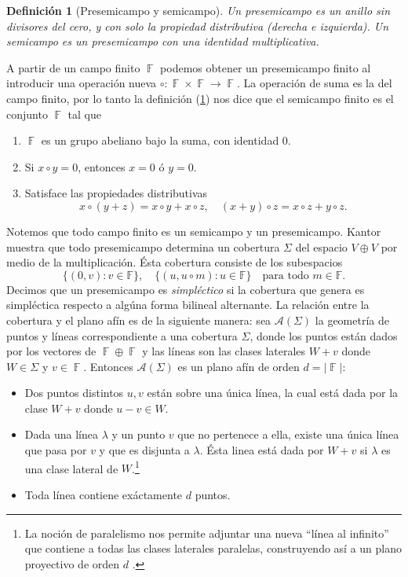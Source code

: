\documentclass[a4paper,11pt]{report}
\DeclareMathOperator{\F}{\mathbb{F}}
\newtheorem{definition}{Definición}
\begin{document}
  \begin{definition}[Presemicampo y semicampo]
    \label{def:presemifield}
    Un presemicampo es un anillo sin divisores del cero, y
    con solo la propiedad distributiva (derecha e
    izquierda). Un semicampo es un presemicampo con una
    identidad multiplicativa.
  \end{definition}
  A partir de un campo finito $\F$ podemos obtener un
  presemicampo finito al introducir una operación nueva
  $\circ : \F \times \F \to \F$. La operación de suma es la
  del campo finito, por lo tanto la definición
  (\ref{def:presemifield}) nos dice que el semicampo finito
  es el conjunto $\F$ tal que
  \begin{enumerate}
    \item $\F$ es un grupo abeliano bajo la suma, con
      identidad $0$.
    \item Si $x \circ y = 0$, entonces $x = 0$ ó $y = 0$.
    \item Satisface las propiedades distributivas
      \[
        x \circ (y + z) = x \circ y + x \circ z,
        \quad
        (x + y) \circ z = x \circ z + y \circ z.
      \] 
  \end{enumerate}
  Notemos que todo campo finito es un semicampo y un
  presemicampo. Kantor muestra que todo presemicampo
  determina un cobertura $\Sigma$ del espacio $V \oplus V$
  por medio de la multiplicación. Ésta cobertura consiste de
  los subespacios
  \begin{equation}
    \label{eqn:presemi_spread}
    \{(0,v) : v \in \mathbb F\},
    \quad 
    \{(u, u \circ m) : u \in \mathbb F\}
    \quad
    \text{para todo } m \in \mathbb F.
  \end{equation}
  Decimos que un presemicampo es \textit{simpléctico} si la
  cobertura que genera es simpléctica respecto a algúna
  forma bilineal alternante. La relación entre la cobertura
  y el plano afín es de la siguiente manera: sea $\mathcal
  A(\Sigma)$ la geometría de puntos y líneas correspondiente
  a una cobertura $\Sigma$, donde los puntos están dados por
  los vectores de $\F \oplus \F$ y las líneas son las clases
  laterales $W + v$ donde $W \in \Sigma$ y $v \in \F$.
  Entonces $\mathcal A(\Sigma)$ es un plano afín de orden $d
  = |\F|$: 
  \begin{itemize}
    \item Dos puntos distintos $u, v$ están sobre una única
      línea, la cual está dada por la clase $W + v$ donde $u
      - v \in W$.
    \item Dada una línea $\lambda$ y un punto $v$ que no
      pertenece a ella, existe una única línea que pasa por
      $v$ y que es disjunta a $\lambda$. Ésta linea está
      dada por $W + v$ si $\lambda$ es una clase lateral de
      $W$.\footnote{La noción de paralelismo 
      nos permite adjuntar una nueva ``línea al
      infinito'' que contiene a todas las clases laterales
      paralelas, construyendo así a un plano proyectivo de
      orden $d$ \cite{kantor1982}.}
    \item Toda línea contiene exáctamente $d$ puntos.
  \end{itemize}
   
\end{document}
